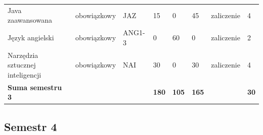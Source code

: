\documentclass[12pt,a4paper]{article}
\begin{document}
{\begin{longtable}{>{\RaggedRight}m{5.0cm}m{1.9cm}m{0.75cm}m{0.85cm}m{0.85cm}m{0.85cm}m{1.45cm}m{0.9cm}}
\rowcolor{tableRowLight} Java zaawansowana & {\scriptsize obowiązkowy} & JAZ & 15 & 0 & 45 & {\scriptsize zaliczenie} & 4 \\
\rowcolor{tableRowAlt} Język angielski & {\scriptsize obowiązkowy} & ANG1-3 & 0 & 60 & 0 & {\scriptsize zaliczenie} & 2 \\
\rowcolor{tableRowLight} Narzędzia sztucznej inteligencji & {\scriptsize obowiązkowy} & NAI & 30 & 0 & 30 & {\scriptsize zaliczenie} & 4 \\
\midrule[\heavyrulewidth]
\rowcolor{tableSummary} \textbf{Suma semestru 3} & & & \textbf{180} & \textbf{105} & \textbf{165} & & \textbf{30} \\
\bottomrule
\end{longtable}}

\subsection*{Semestr 4}
\end{document}
